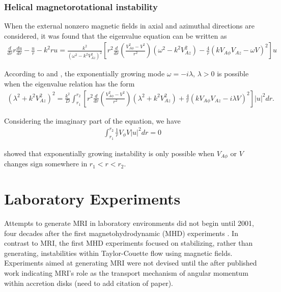 \documentclass{jfm}
\begin{document}
\subsubsection{Helical magnetorotational instability}

When the external nonzero magnetic fields in axial and azimuthal directions are
considered, it was found that the eigenvalue equation can be written as
\begin{align}
    \frac{d}{dr}r\frac{du}{dr}-\frac{u}{r}-k^2ru = \frac{k^2}{(\omega^2-k^2 V_{Az}^2)^2}\left[r^2 \frac{d}{dr}\left(\frac{V_{A\phi}^2-V^2}{r^2}\right)
    (\omega^2-k^2V_{Az}^2) 
    -\frac{4}{r}(kV_{A\phi}V_{Az}-\omega V)^2\right]u
\end{align}

According to \cite{Knobloch1992} and \cite{Julien2010}, the exponentially 
growing mode $\omega =-i\lambda$, $\lambda>0$ is possible when the eigenvalue 
relation has the form
\begin{align}
    (\lambda^2 +k^2 V_{Az}^2)^2 = \frac{k^2}{D}\int_{r_1}^{r_2} \left[ r^2 \frac{d}{dr}\left( \frac{V_{A\phi}^2-V^2}{r^2}\right)(\lambda^2+k^2 V_{Az}^2) + \frac{4}{r}(k V_{A\phi} V_{Az}-i\lambda V)^2 \right]|u|^2 dr.
\end{align}

Considering the imaginary part of the equation, we have 
\begin{align}
    \int_{r_1}^{r_2} \frac{1}{r}V_\phi V |u|^2 dr =0
\end{align}

\cite{Knobloch1992} showed that exponentially growing instability is only possible 
when $V_{A\phi}$ or $V$ changes sign somewhere in $r_1< r < r_2$.



\section{Laboratory Experiments}
\label{sec:experiments}

Attempts to generate MRI in laboratory environments did not begin until 2001,
four decades after the first magnetohydrodynamic (MHD) experiments
\citep{Donnelly1960}. In contrast to MRI, the first MHD experiments focused on
stabilizing, rather than generating, instabilities within Taylor-Couette flow
using magnetic fields. Experiments aimed at generating MRI were not devised
until the after published work indicating MRI's role as the transport mechanism
of angular momentum within accretion disks (need to add citation of paper).
\end{document}
